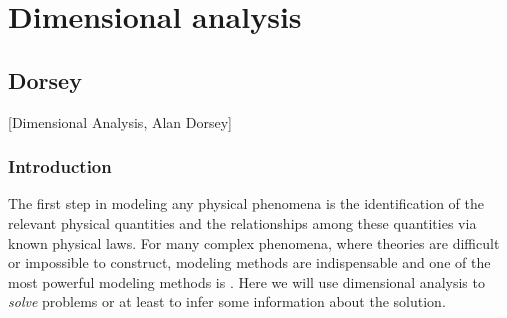 \section{Dimensional analysis}


\subsection{Dorsey}
[Dimensional Analysis, Alan Dorsey]


\subsubsection{Introduction}
The first step in modeling any physical phenomena is the identification of the relevant physical quantities and the relationships among these quantities via known physical laws. For many complex phenomena, where  theories are difficult or impossible to construct, modeling methods are indispensable and one of the most powerful modeling methods is . Here we will use dimensional analysis to \emph{solve} problems or at least to infer some information about the solution.

